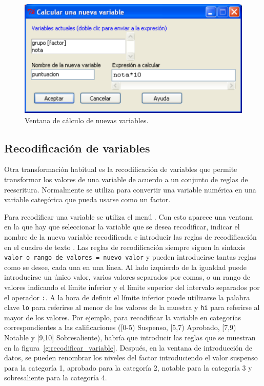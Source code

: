 \begin{figure}[htp]
\begin{center}
  \includegraphics[scale=0.6]{introduccion_r/img/calcular}
  \caption{Ventana de cálculo de nuevas variables.}
  \label{g:calcular_variable}
\end{center}
\end{figure}


\subsection{Recodificación de variables}
Otra transformación habitual es la recodificación de variables que permite transformar los valores de una variable de
acuerdo a un conjunto de reglas de reescritura. Normalmente se utiliza para convertir una variable numérica en una
variable categórica que pueda usarse como un factor. 

Para recodificar una variable se utiliza el menú .
Con esto aparece una ventana en la que hay que seleccionar la variable que se desea recodificar, indicar el nombre de la
nueva variable recodificada e introducir las reglas de recodificación en el cuadro de texto .
Las reglas de recodificación siempre siguen la sintaxis \lstinline{valor o rango de valores = nuevo valor} y pueden
introducirse tantas reglas como se desee, cada una en una línea.
Al lado izquierdo de la igualdad puede introducirse un único valor, varios valores separados por comas, o un rango de
valores indicando el límite inferior y el límite superior del intervalo separados por el operador \lstinline{:}.
A la hora de definir el límite inferior puede utilizarse la palabra clave \lstinline{lo} para referirse al menor de los
valores de la muestra y \lstinline{hi} para referirse al mayor de los valores.
Por ejemplo, para recodificar la variable  en categorías correspondientes a las calificaciones ([0-5)
Suspenso, [5,7) Aprobado, [7,9) Notable y [9,10] Sobresaliente), habría que introducir las reglas que se muestran en la
figura~\ref{g:recodificar_variable}. Después, en la ventana de introducción de datos, se pueden renombrar los niveles
del factor introduciendo el valor suspenso para la categoría 1, aprobado para la categoría 2, notable para la categoría
3 y sobresaliente para la categoría 4. 

